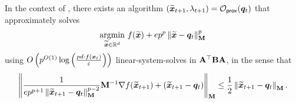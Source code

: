 \begin{lemma}
\label{lemma:prox_subproblem_ms}
In the context of , there exists an algorithm $(\xtilde_{t+1},\lambda_{t+1})=\oprox(\vq_t)$ that approximately solves
\begin{align*}
    \argmin{\xtilde\in\R^d} f(\xtilde)+ep^p\norm{\xtilde-\vq_t}_{\mM}^p
\end{align*}
using $O\inparen{p^{O(1)}\logv{\frac{pd \cdot f(\vx_t)}{\eps}}}$ linear-system-solves in $\mA^{\top}\mB\mA$, in the sense that
\begin{align*}
    \norm{\frac{1}{ep^{p+1}\norm{\xtilde_{t+1}-\vq_t}_{\mM}^{p-2}}\mM^{-1}\nabla f(\xtilde_{t+1})+(\xtilde_{t+1}-\vq_t)}_{\mM} \le \frac{1}{2}\norm{\xtilde_{t+1}-\vq_t}_{\mM}.
\end{align*}
\end{lemma}
